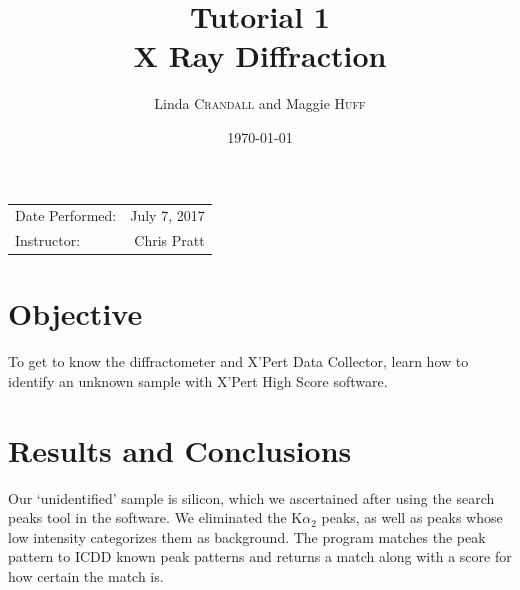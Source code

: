 \documentclass{article}
\title{Tutorial 1\\ X Ray Diffraction \\ } %
\author{Linda \textsc{Crandall} and Maggie \textsc{Huff}} %
\date{\today} %
\begin{document}
\maketitle %

\begin{center}
\begin{tabular}{l r}
Date Performed: & July 7, 2017 \\ %
Instructor: & Chris Pratt %
\end{tabular}
\end{center}



\section{Objective}

To get to know the diffractometer and X'Pert Data Collector, learn how to identify an unknown sample with X'Pert High Score software. 




\section{Results and Conclusions}

Our `unidentified' sample is silicon, which we ascertained after using the search peaks tool in the software. We eliminated the K$\alpha_2$ peaks, as well as peaks whose low intensity categorizes them as background. The program matches the peak pattern to ICDD known peak patterns and returns a match along with a score for how certain the match is.  
\end{document}
